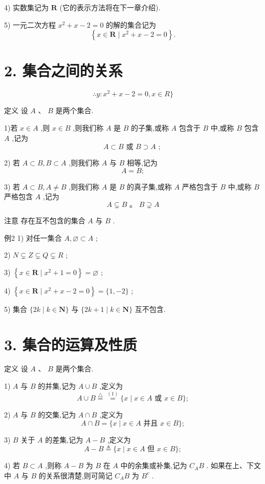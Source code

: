 4) 实数集记为 $\mathbf{R}$ (它的表示方法将在下一章介绍).

5) 一元二次方程 ${x}^{2} + x - 2 = 0$ 的解的集合记为
$$\left\{  {x \in  \mathbf{R} \mid  {x}^{2} + x - 2 = 0}\right\}  .$$

\section*{2. 集合之间的关系}
$$\therefore y : {x}^{2} + x - 2 = 0,x \in  R\}$$

定义 设 $A\text{ 、 }B$ 是两个集合.

1)若 $x \in  A$ ,则 $x \in  B$ ,则我们称 $A$ 是 $B$ 的子集,或称 $A$ 包含于 $B$ 中,或称 $B$ 包含 $A$ ,记为
$$A \subset  B\text{ 或 }B \supset  A\text{ ; }$$

2) 若 $A \subset  B,B \subset  A$ ,则我们称 $A$ 与 $B$ 相等,记为
$$A = B;$$

3) 若 $A \subset  B,A \neq  B$ ,则我们称 $A$ 是 $B$ 的真子集,或称 $A$ 严格包含于 $B$ 中,或称 $B$ 严格包含 $A$ ,记为
$$A \subsetneq  B\text{ 。 }B \supsetneq  A$$

注意 存在互不包含的集合 $A$ 与 $B$ .

例2 1) 对任一集合 $A,\varnothing  \subset  A$ ;

2) $N \subsetneq  Z \subsetneq  Q \subsetneq  R$ ;

3) $\left\{  {x \in  \mathbf{R} \mid  {x}^{2} + 1 = 0}\right\}   = \varnothing$ ;

4) $\left\{  {x \in  \mathbf{R} \mid  {x}^{2} + x - 2 = 0}\right\}   = \{ 1, - 2\}$ ;

5) 集合 $\{ {2k} \mid  k \in  \mathbf{N}\}$ 与 $\{ {2k} + 1 \mid  k \in  \mathbf{N}\}$ 互不包含.

\section*{3. 集合的运算及性质}

定义 设 $A\text{ 、 }B$ 是两个集合.

1) $A$ 与 $B$ 的并集,记为 $A \cup  B$ ,定义为
$$A \cup  B\overset{ \bigtriangleup  }{ = }\overset{\left( 1\right) }{ = }\{ x \mid  x \in  A\text{ 或 }x \in  B\} ;$$

2) $A$ 与 $B$ 的交集,记为 $A \cap  B$ ,定义为
$$A \cap  B = \{ x \mid  x \in  A\text{ 并且 }x \in  B\} ;$$

3) $B$ 关于 $A$ 的差集,记为 $A - B$ ,定义为
$$A - B \triangleq  \{ x \mid  x \in  A\text{ 但 }x \in  B\} ;$$

4) 若 $B \subset  A$ ,则称 $A - B$ 为 $B$ 在 $A$ 中的余集或补集,记为 ${C}_{A}B$ . 如果在上、下文中 $A$ 与 $B$ 的关系很清楚,则可简记 ${C}_{A}B$ 为 ${B}^{c}$ .

